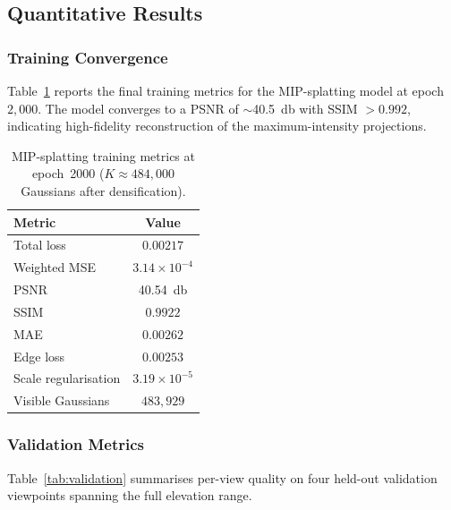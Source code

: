 \subsection{Quantitative Results}
\label{sec:exp-quantitative}

\subsubsection{Training Convergence}
Table~\ref{tab:training-final} reports the final training metrics for
the MIP-splatting model at epoch~$2{,}000$.
The model converges to a PSNR of $\sim$\SI{40.5}{\decibel} with SSIM
$>0.992$, indicating high-fidelity reconstruction of the
maximum-intensity projections.

\begin{table}[htbp]
  \centering
  \caption{%
    MIP-splatting training metrics at epoch~2000
    ($K\approx484{,}000$ Gaussians after densification).%
  }
  \label{tab:training-final}
  \begin{tabular}{lc}
    \toprule
    \textbf{Metric}        & \textbf{Value} \\
    \midrule
    Total loss             & $0.00217$  \\
    Weighted MSE           & $3.14\times10^{-4}$ \\
    PSNR                   & \SI{40.54}{\decibel} \\
    SSIM                   & $0.9922$   \\
    MAE                    & $0.00262$  \\
    Edge loss              & $0.00253$  \\
    Scale regularisation   & $3.19\times10^{-5}$ \\
    Visible Gaussians      & $483{,}929$ \\
    \bottomrule
  \end{tabular}
\end{table}

\subsubsection{Validation Metrics}
Table~\ref{tab:validation} summarises per-view quality on four held-out
validation viewpoints spanning the full elevation range.

